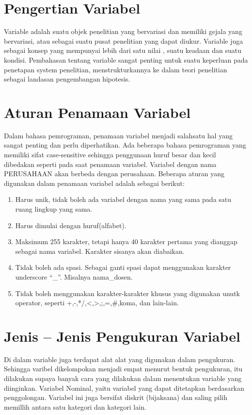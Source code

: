 

\section{Pengertian Variabel}
Variable adalah suatu objek penelitian yang bervariasi dan memiliki gejala yang bervariasi, atau sebagai suatu pusat penelitian yang dapat 
diukur. Variable juga sebagai konsep yang mempunyai  lebih dari satu nilai , suatu keadaan dan suatu kondisi. Pembahasan tentang variable 
sangat  penting  untuk suatu keperluan pada penetapan system penelitian, menstrukturkannya ke dalam teori penelitian sebagai landasan 
pengembangan hipotesis.

\section{Aturan Penamaan Variabel}
Dalam bahasa pemrograman, penamaan variabel menjadi salahsatu hal yang sangat penting dan perlu diperhatikan. 
Ada beberapa bahasa pemrograman yang memiliki sifat case-sensitive sehingga penggunaan huruf besar dan kecil dibedakan seperti pada saat penamaan variabel. Variabel dengan nama PERUSAHAAN akan berbeda dengan perusahaan. 
Beberapa aturan yang  digunakan dalam penamaan variabel adalah sebagai berikut:
\begin{enumerate}
\item Harus unik, tidak boleh ada variabel dengan nama yang sama pada satu ruang lingkup yang sama.
\item Harus dimulai dengan huruf(alfabet).
\item Maksimum 255 karakter, tetapi hanya 40 karakter pertama yang dianggap sebagai nama variabel. Karakter sisanya akan diabaikan.
\item Tidak boleh ada spasi. Sebagai ganti spasi dapat menggunakan karakter underscore “_”. Misalnya nama_dosen.
\item Tidak boleh menggunakan karakter-karakter khusus yang digunakan unutk operator, seperti +,-,*/,<,>,;,=,#,koma, dan lain-lain.
\end{enumerate}

\section{Jenis – Jenis Pengukuran Variabel}
Di dalam variable juga terdapat alat alat yang digunakan dalam pengukuran. Sehingga varibel dikelompokan menjadi empat menurut bentuk   
pengukuran, itu dilakukan supaya banyak cara yang dilakukan dalam menentukan variable yang diinginkan. Variabel Nominal, yaitu variabel
yang dapat ditetapkan berdasarkan penggolongan. Variabel ini juga bersifat diskrit (bijaksana) dan saling pilih memillih antara satu 
kategori dan kategori lain.

